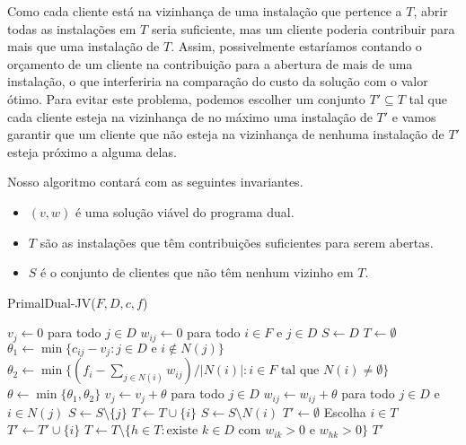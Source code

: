 Como cada cliente está na vizinhança de uma instalação que pertence a $T$, abrir todas as instalações em $T$ seria suficiente, mas um cliente poderia contribuir para mais que uma instalação de $T$. Assim, possivelmente estaríamos contando o orçamento de um cliente na contribuição para a abertura de mais de uma instalação, o que interferiria na comparação do custo da solução com o valor ótimo.
Para evitar este problema, podemos escolher um conjunto $T' \subseteq T$ tal que cada cliente esteja na vizinhança de no máximo uma instalação de $T'$ e vamos garantir que um cliente que não esteja na vizinhança de nenhuma instalação de $T'$ esteja próximo a alguma delas.

Nosso algoritmo contará com as seguintes invariantes.
\begin{itemize}
    \item $(v,w)$ é uma solução viável do programa dual.
    \item $T$ são as instalações que têm contribuições suficientes para serem abertas.
    \item $S$ é o conjunto de clientes que não têm nenhum vizinho em $T$.
\end{itemize}
\begin{algorithm}[tbh]
    \caption{\sc PrimalDual-JV(${F,D,c,f}$)}
    \label{fl:primaldual}
    \begin{algorithmic}[1]
        \State $v_j \gets 0$ para todo $j \in D$
        \State $w_{ij} \gets 0$ para todo $i \in F$ e $j \in D$
        \State $S \gets D$
        \State $T \gets \emptyset$
        \State $\theta_1 \gets \min\{c_{ij}-v_j : j \in D \text{ e } i \not\in N(j)\}$ \label{theta1}
        \State $\theta_2 \gets \min\{(f_i - \sum_{j \in N(i)}w_{ij})/|N(i)| : i \in F \text{ tal que } N(i) \neq \emptyset \} \label{theta2}$
        \State $\theta \gets \min\{\theta_1,\theta_2\} \label{theta}$
        \State $v_j \gets v_j + \theta$ para todo $j \in D$
        \State $w_{ij} \gets w_{ij} + \theta$ para todo $j \in D$ e $i \in N(j)$ 
        \State $S \gets S \setminus \{j\}$
        \EndIf
        \State $T \gets T \cup \{i\}$
        \State $S \gets S\setminus N(i)$
        \EndIf
        \EndWhile
        \State $T' \gets \emptyset$
        \State Escolha $i \in T$
        \State $T' \gets T' \cup \{i\}$
        \State $T \gets T \setminus \{h \in T : \text{existe $k \in D$ com $w_{ik}> 0 $ e $w_{hk} > 0$} \}$
        \EndWhile
        \State \Return $T'$
    \end{algorithmic}
\end{algorithm}

